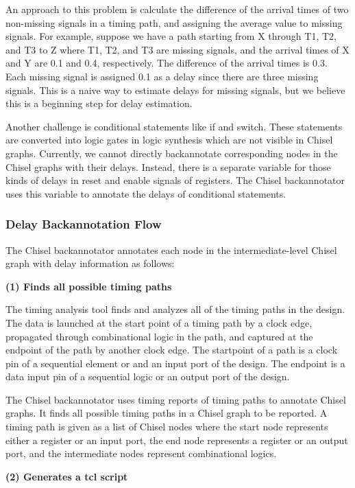 An approach to this problem is calculate the difference of the arrival times of two non-missing signals in a timing path, and assigning the average value to missing signals. For example, suppose we have a path starting from X through T1, T2, and T3 to Z where T1, T2, and T3 are missing signals, and the arrival times of X and Y are 0.1 and 0.4, respectively. The difference of the arrival times is 0.3.  Each missing signal is assigned 0.1 as a delay since there are three missing signals. This is a naive way to estimate delays for missing signals, but we believe this is a beginning step for delay estimation.

Another challenge is conditional statements like if and switch. These statements are converted into logic gates in logic synthesis which are not visible in Chisel graphs. Currently, we cannot directly backannotate corresponding nodes in the Chisel graphs with their delays. Instead, there is a separate variable for those kinds of delays in reset and enable signals of registers. The Chisel backannotator uses this variable to annotate the delays of conditional statements.

\subsubsection{Delay Backannotation Flow}
\label{backannotation flow}
The Chisel backannotator annotates each node in the intermediate-level Chisel graph with delay information as follows:

{\bf (1) Finds all possible timing paths}
	
The timing analysis tool finds and analyzes all of the timing paths in the design. The data is launched at the start point of a timing path by a clock edge, propagated through combinational logic in the path, and captured at the endpoint of the path by another clock edge. The startpoint of a path is a clock pin of a sequential element or and an input port of the design. The endpoint is a data input pin of a sequential logic or an output port of the design. 

The Chisel backannotator uses timing reports of timing paths to annotate Chisel graphs. It finds all possible timing paths in a Chisel graph to be reported. A timing path is given as a list of Chisel nodes where the start node represents either a register or an input port, the end node represents a register or an output port, and the intermediate nodes represent combinational logics. 

{\bf (2) Generates a tcl script}

